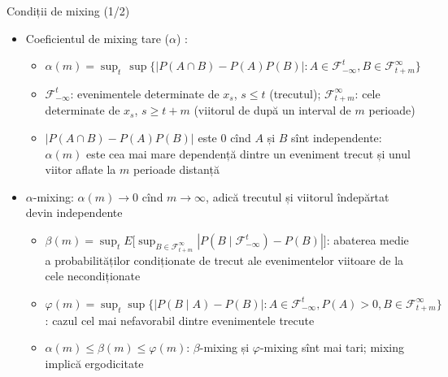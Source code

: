 \begin{frame}{Condiții de mixing (1/2)}
\itemsize{\small}
\begin{itemize}
    \item Coeficientul de mixing tare ($\alpha$) :
    \begin{itemize}
        \item $\alpha(m) = \sup_t\,\sup\{|P(A\cap B) - P(A)P(B)|: A \in \mathcal{F}_{-\infty}^{t}, B \in \mathcal{F}_{t+m}^{\infty}\}$
        \item $\mathcal{F}_{-\infty}^{t}$: evenimentele determinate de $x_s$, $s \le t$ (trecutul); $\mathcal{F}_{t+m}^{\infty}$: cele determinate de $x_s$, $s \ge t + m$ (viitorul de după un interval de $m$ perioade)
        \item $|P(A\cap B) - P(A)P(B)|$ este 0 cînd $A$ și $B$ sînt independente: $\alpha(m)$ este cea mai mare dependență dintre un eveniment trecut și unul viitor aflate la $m$ perioade distanță
    \end{itemize}
    \item $\alpha$-mixing: $\alpha(m) \to 0$ cînd $m \to \infty$, adică trecutul și viitorul îndepărtat devin independente
    \begin{itemize}
        \item $\beta(m) = \sup_t E\big[\sup_{B \in \mathcal{F}_{t+m}^{\infty}}|P(B \mid \mathcal{F}_{-\infty}^{t}) - P(B)|\big]$: abaterea medie a probabilităților condiționate de trecut ale evenimentelor viitoare de la cele necondiționate
        \item $\varphi(m) = \sup_t\sup\{|P(B \mid A) - P(B)|: A \in \mathcal{F}_{-\infty}^{t}, P(A) > 0, B \in \mathcal{F}_{t+m}^{\infty}\}$: cazul cel mai nefavorabil dintre evenimentele trecute
        \item $\alpha(m) \le \beta(m) \le \varphi(m)$: $\beta$-mixing și $\varphi$-mixing sînt mai tari; mixing implică ergodicitate 
    \end{itemize}
\end{itemize}
\end{frame}

